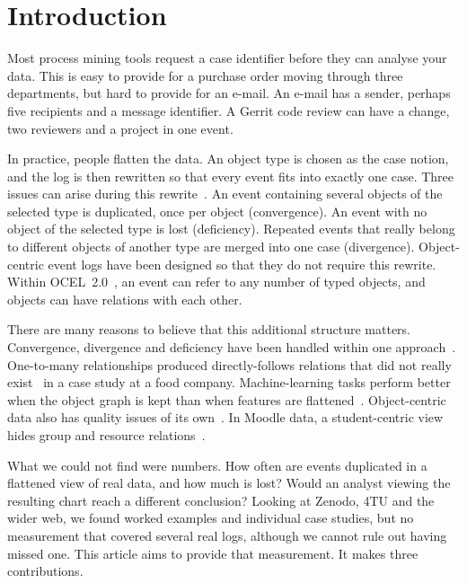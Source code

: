 \documentclass[pdflatex,sn-mathphys-num]{sn-jnl}
\begin{document}
\maketitle

\section{Introduction}\label{sec:intro}

Most process mining tools request a case identifier before they can analyse your data. This is easy to provide for a purchase order moving through three departments, but hard to provide for an e-mail. An e-mail has a sender, perhaps five recipients and a message identifier. A Gerrit code review can have a change, two reviewers and a project in one event.

In practice, people flatten the data. An object type is chosen as the case notion, and the log is then rewritten so that every event fits into exactly one case. Three issues can arise during this rewrite~\cite{vanderaalst2019ocpm}. An event containing several objects of the selected type is duplicated, once per object (convergence). An event with no object of the selected type is lost (deficiency). Repeated events that really belong to different objects of another type are merged into one case (divergence). Object-centric event logs have been designed so that they do not require this rewrite. Within OCEL~2.0~\cite{berti2024ocel20}, an event can refer to any number of typed objects, and objects can have relations with each other.

There are many reasons to believe that this additional structure matters. Convergence, divergence and deficiency have been handled within one approach~\cite{adams2024addressing}. One-to-many relationships produced directly-follows relations that did not really exist~\cite{waibel2022causal} in a case study at a food company. Machine-learning tasks perform better when the object graph is kept than when features are flattened~\cite{adams2023preserving}. Object-centric data also has quality issues of its own~\cite{kabierski2026quality}. In Moodle data, a student-centric view hides group and resource relations~\cite{miri2026educational}.

What we could not find were numbers. How often are events duplicated in a flattened view of real data, and how much is lost? Would an analyst viewing the resulting chart reach a different conclusion? Looking at Zenodo, 4TU and the wider web, we found worked examples and individual case studies, but no measurement that covered several real logs, although we cannot rule out having missed one. This article aims to provide that measurement. It makes three contributions.
\end{document}
